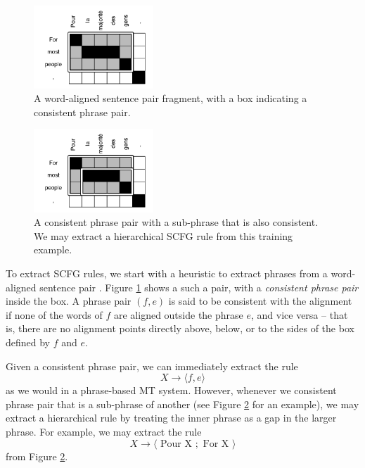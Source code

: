 \documentclass[a4paper]{article}
\begin{document}
\begin{figure}[t]
\includegraphics[width=0.4\textwidth]{figures/simple-rule}
\caption{A word-aligned sentence pair fragment, with a box indicating a consistent phrase pair.\label{fig:aligned-sentence}}
\end{figure}

\begin{figure}[t]
\includegraphics[width=0.4\textwidth]{figures/hierarchical-rule}
\caption{A consistent phrase pair with a sub-phrase that is also consistent. We may extract a hierarchical SCFG rule from this training example.\label{fig:hierarchical-phrases}}
\end{figure}

To extract SCFG rules, we start with a heuristic to extract phrases from a word-aligned sentence pair \cite{tillmann-2003}. Figure \ref{fig:aligned-sentence} shows a such a pair, with a {\em consistent phrase pair} inside the box. A phrase pair $(f,e)$ is said to be consistent with the alignment if none of the words of $f$ are aligned outside the phrase $e$, and vice versa -- that is, there are no alignment points directly above, below, or to the sides of the box defined by $f$ and $e$.

Given a consistent phrase pair, we can immediately extract the rule
\begin{equation}
X \to \langle f , e \rangle
\end{equation}
as we would in a phrase-based MT system. However, whenever we consistent phrase pair that is a sub-phrase of another (see Figure \ref{fig:hierarchical-phrases} for an example), we may extract a hierarchical rule by treating the inner phrase as a gap in the larger phrase. For example, we may extract the rule
\begin{equation}
X \to \langle \textrm{ Pour X }; \textrm{ For X } \rangle
\label{eqn:hiero-rule}
\end{equation}
from Figure \ref{fig:hierarchical-phrases}.
\end{document}
